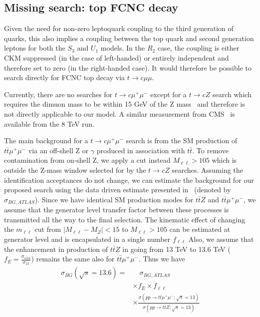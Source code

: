 \documentclass[12pt]{revtex4-2}
\numberwithin{equation}{section}
\begin{document}
\subsection{Missing search: top FCNC decay}

Given the need for non-zero leptoquark coupling to the third generation of quarks, this also implies a coupling between the top quark and second generation leptons for both the $S_3$ and $U_1$ models.  In the $R_2$ case, the coupling is either CKM suppressed (in the case of left-handed) or entirely independent and therefore set to zero (in the right-handed case).  It would therefore be possible to search directly for FCNC top decay via  $t \rightarrow c \mu \mu$.  

Currently, there are no searches for $t \rightarrow c \mu^+ \mu^-$ except for a $t \rightarrow c Z$ search which requires the dimuon mass to be within 15 GeV of the Z mass~\cite{ATLAS:2018zsq} and therefore is not directly applicable to our model. 
 A similar measurement from CMS~\cite{CMS:2017wcz} is available from the 8 TeV run.  
 
 The main background for a $t \rightarrow c \mu^{+} \mu^{-}$ search is from the SM production of $t \bar t \mu^+ \mu^-$ via an off-shell Z or $\gamma$ produced in association with $t \bar t$.  
 To remove contamination from on-shell Z, we apply a cut instead $M_{\ell \ell} > 105$ which is outside the Z-mass window selected for by the $t \rightarrow c Z$ searches.  
 Assuming the identification acceptances do not change, we can estimate the background for our proposed search using the data driven estimate presented in~\cite{ATLAS:2018zsq} (denoted by $\sigma_{BG, ATLAS}$).  Since we have identical SM production modes for $t \bar t Z$ and $t \bar t \mu^+ \mu^-$, we assume that the generator level transfer factor between these processes is transmitted all the way to the final selection.  The kinematic effect of changing the $m_{\ell \ell}$ cut from $|M_{\ell \ell} - M_Z | < 15$ to $M_{\ell \ell} > 105$ can be estimated at generator level and is encapsulated in a single number $f_{\ell \ell}$ Also, we assume that the enhancement in production of $t \bar t Z$ in going from 13 TeV to 13.6 TeV ($f_E = \frac{\sigma_{13.6}}{\sigma_{13}}$) remains the same also for $t \bar t \mu^+ \mu^-$.  Thus we have
 \begin{align}
 \sigma_{BG}(\sqrt s = 13.6) = & \quad \sigma_{BG, ATLAS} \nonumber \\
 & \times f_E \times f_{\ell \ell} \nonumber \\
 & \times \frac{\sigma(pp \rightarrow t \bar t \mu^+ \mu^-; \sqrt s = 13)}{\sigma(pp \rightarrow t \bar t Z; \sqrt s = 13)} 
\end{align}
\end{document}
